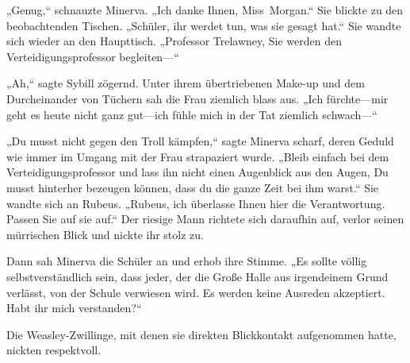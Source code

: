 „Genug,“ schnauzte Minerva. „Ich danke Ihnen, Miss~Morgan.“ Sie blickte zu den beobachtenden Tischen. „Schüler, ihr werdet tun, was sie gesagt hat.“ Sie wandte sich wieder an den Haupttisch. „Professor Trelawney, Sie werden den Verteidigungsprofessor begleiten—“

„Ah,“ sagte Sybill zögernd. Unter ihrem übertriebenen Make-up und dem Durcheinander von Tüchern sah die Frau ziemlich blass aus. „Ich fürchte—mir geht es heute nicht ganz gut—ich fühle mich in der Tat ziemlich schwach—“

„Du musst nicht gegen den Troll kämpfen,“ sagte Minerva scharf, deren Geduld wie immer im Umgang mit der Frau strapaziert wurde. „Bleib einfach bei dem Verteidigungsprofessor und lass ihn nicht einen Augenblick aus den Augen, Du musst hinterher bezeugen können, dass du die ganze Zeit bei ihm warst.“ Sie wandte sich an Rubeus. „Rubeus, ich überlasse Ihnen hier die Verantwortung. Passen Sie auf sie auf.“
Der riesige Mann richtete sich daraufhin auf, verlor seinen mürrischen Blick und nickte ihr stolz zu.

Dann sah Minerva die Schüler an und erhob ihre Stimme. „Es sollte völlig selbstverständlich sein, dass jeder, der die Große Halle aus irgendeinem Grund verlässt, von der Schule verwiesen wird. Es werden keine Ausreden akzeptiert. Habt ihr mich verstanden?“

Die Weasley-Zwillinge, mit denen sie direkten Blickkontakt aufgenommen hatte, nickten respektvoll.

